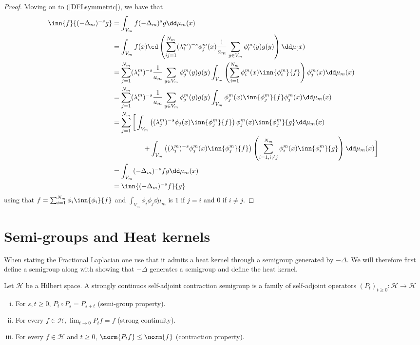 \begin{proof}
	Moving on to (\ref{DFLsymmetric}), we have that
	\begin{align}
		\inn{f}{(-\Delta_{m})^{-s}g} & = \int_{V_m} f (-\Delta_{m})^{s}g \dd \mu_m(x) \\
		&= \int_{V_m} f(x) \cd \left(\sum_{ij = 1}^{N_m} (\lambda_{i}^{m})^{-s} \phi_{j}^{m}(x) \frac{1}{a_m} \sum_{y \in V_m} \phi_{i}^{m}(y)g(y)\right) \dd \mu_(x) \\
		&= \sum_{j = 1}^{N_m} (\lambda_{i}^{m})^{-s} \frac{1}{a_m} \sum_{y \in V_m} \phi_{j}^{m}(y)g(y) \int_{V_m} \left(\sum_{i =1}^{N_m}\phi^{m}_i(x) \inn{\phi^{m}_i}{f} \right) \phi^{m}_j(x) \dd \mu_m(x) \\
		&=\sum_{j = 1}^{N_m} (\lambda_{i}^{m})^{-s} \frac{1}{a_m} \sum_{y \in V_m} \phi_{j}^{m}(y)g(y) \int_{V_m} \phi^{m}_j(x) \inn{\phi^{m}_j}{f} \phi^{m}_j(x) \dd \mu_m(x) \\
		& = \sum_{j = 1}^{N_m} \bigg[ \int_{V_m} \left((\lambda_j^{m})^{-s} \phi_j(x) \inn{\phi_j^{m}}{f}\right) \phi_j^{m}(x) \inn{\phi_j^{m}}{g} \dd \mu_m(x) \\
		&\phantom{a} \qquad \qquad + \int_{V_m} \left((\lambda^{m}_{j})^{-s} \phi_j^{m}(x)\inn{\phi_j^{m}}{f} \right) \left(\sum_{i = 1, i \neq j}^{N_m} \phi_i^{m}(x) \inn{\phi_i^{m}}{g}\right) \dd \mu_m(x)\bigg] \\
		&= \int_{V_m} (-\Delta_{m})^{-s}f g \dd \mu_m(x) \\
		&=\inn{(-\Delta_{m})^{-s}f}{g}
	\end{align}
	using that $f = \sum_{i =1}^{N_m}\phi_i \inn{\phi_i}{f}$ and $\int_{V_m}\phi_i \phi_j \dd \mu_m$ is $1$ if $j = i$ and $0$ if $i \neq j$.
\end{proof}


\section{Semi-groups and Heat kernels}
When stating the Fractional Laplacian one use that it admits a heat kernel through a semigroup generated by $-\Delta$. We will therefore first define a semigroup along with showing that $-\Delta$ generates a semigroup and define the heat kernel.

\begin{defi}\label{semigroupDef}
	Let $\mathcal{H}$ be a Hilbert space. A strongly continuos self-adjoint contraction semigroup is a family of self-adjoint operators $(P_t)_{t \geq 0}: \mathcal{H} \to \mathcal{H}$
	\begin{enumerate}[(i)]
		\item For $s,t \geq 0$, $P_t \circ P_s = P_{s +t}$ (semi-group property). \label{semi-group}
		\item For every $f \in \mathcal{H}, \lim_{t \to 0} P_t f= f$ (strong continuity).\label{strong cont}
		\item For every $f \in \mathcal{H}$ and $t \geq 0$, $\norm{P_t f} \leq \norm{f}$ (contraction property). \label{semi-group contraction}
	\end{enumerate}
\end{defi}

